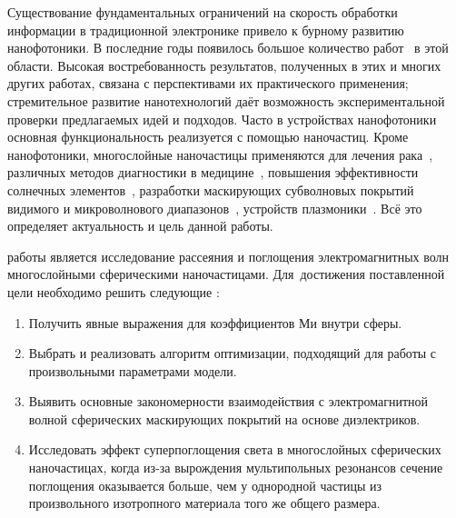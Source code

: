 {\actuality} Существование фундаментальных ограничений на скорость
обработки информации в традиционной электронике привело к бурному
развитию нанофотоники. В последние годы появилось большое количество
работ~\cite{Tame-quantum-plasmonics-2013,
  Javier-graphene-plasmonics-2014, Khurgin-loss-plasmonics-2015,
  He-tunable-terahertz-graphene-metamaterials-2015,
  Segal-meta-nonlinar-PhC-2015,
  Poddubny-hyperbolic-metamaterials-2013, Kildishev-metasurface-2013}
в этой области.  Высокая востребованность результатов, полученных в
этих и многих других работах, связана с перспективами их практического
применения; стремительное развитие нанотехнологий даёт возможность
экспериментальной проверки предлагаемых идей и подходов. Часто в
устройствах нанофотоники основная функциональность реализуется с
помощью наночастиц. Кроме нанофотоники, многослойные наночастицы применяются
для лечения рака~\cite{Zhang-2010, Hirsch-2003}, различных методов
диагностики в медицине~\cite{Allain-2002}, повышения эффективности
солнечных элементов~\cite{Kameya-2011, Mann-2011}, разработки
маскирующих субволновых покрытий видимого и микроволнового
диапазонов~\cite{Qui-2009, Semouchkina-2013}, устройств
плазмоники~\cite{Martin-2013, Alu-2005}.  Всё это определяет
актуальность и цель данной работы.

{\aim} работы является %
исследование рассеяния и поглощения электромагнитных волн многослойными
сферическими наночастицами.
Для~достижения поставленной цели необходимо решить следующие {\tasks}:
\begin{enumerate} %
  \item Получить явные выражения для коэффициентов Ми внутри сферы.
  \item Выбрать и реализовать алгоритм оптимизации, подходящий для
    работы с произвольными параметрами модели.%
  \item Выявить основные закономерности взаимодействия с
    электромагнитной волной сферических маскирующих покрытий на
    основе диэлектриков.
  \item Исследовать эффект суперпоглощения света в многослойных
    сферических наночастицах, когда из-за вырождения мультипольных
    резонансов сечение поглощения оказывается больше, чем у однородной
    частицы из произвольного изотропного материала того же общего
    размера.
\end{enumerate}

